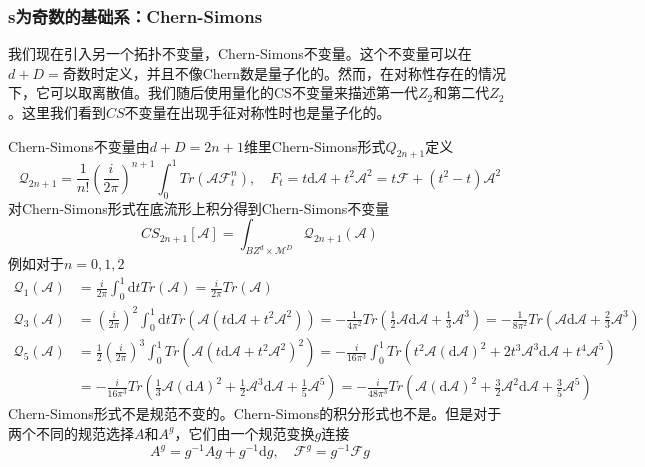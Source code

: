 \documentclass{article}
\numberwithin{equation}{subsection}
\begin{document}
\subsubsection{s为奇数的基础系：Chern-Simons}
我们现在引入另一个拓扑不变量，Chern-Simons不变量。这个不变量可以在$d+D=$奇数时定义，并且不像Chern数是量子化的。然而，在对称性存在的情况下，它可以取离散值。我们随后使用量化的CS不变量来描述第一代$Z_2$和第二代$Z_2$。这里我们看到$CS$不变量在出现手征对称性时也是量子化的。

Chern-Simons不变量由$d+D=2n+1$维里Chern-Simons形式$Q_{2n+1}$定义
\begin{equation}
    \mathcal{Q}_{2n+1}=\frac{1}{n!}\left(\frac{i}{2\pi}\right)^{n+1}\int_{0}^{1}Tr(\mathcal{AF}_{t}^n),\quad F_t=t\mathrm{d}\mathcal{A}+t^2\mathcal{A}^2=t\mathcal{F}+(t^2-t)\mathcal{A}^2
\end{equation}
对Chern-Simons形式在底流形上积分得到Chern-Simons不变量
\begin{equation}
    CS_{2n+1}[\mathcal{A}]=\int_{BZ^d\times\mathcal{M}^D}\mathcal{Q}_{2n+1}(\mathcal{A})
\end{equation}
例如对于$n=0,1,2$
\begin{equation}
    \begin{split}
        \mathcal{Q}_1(\mathcal{A})&=\frac{i}{2\pi}\int_0^1\mathrm{d}tTr(\mathcal{A})=\frac{i}{2\pi}Tr(\mathcal{A})\\
        \mathcal{Q}_3(\mathcal{A})&=\left(\frac{i}{2\pi}\right)^{2}\int_0^1\mathrm{d}tTr(\mathcal{A}(t\mathrm{d}\mathcal{A}+t^2\mathcal{A}^2))=-\frac{1}{4\pi^2}Tr(\frac{1}{2}\mathcal{A}\mathrm{d}\mathcal{A}+\frac{1}{3}\mathcal{A}^3)=-\frac{1}{8\pi^2}Tr(\mathcal{A}\mathrm{d}\mathcal{A}+\frac{2}{3}\mathcal{A}^3)\\
        \mathcal{Q}_5(\mathcal{A})&=\frac{1}{2}\left(\frac{i}{2\pi}\right)^3\int_0^1Tr(\mathcal{A}(t\mathrm{d}\mathcal{A}+t^2\mathcal{A}^2)^2)=-\frac{i}{16\pi^3}\int_0^1Tr(t^2\mathcal{A}(\mathrm{d}\mathcal{A})^2+2t^3\mathcal{A}^3\mathrm{d}\mathcal{A}+t^4\mathcal{A}^5)\\
        &=-\frac{i}{16\pi^3}Tr(\frac{1}{3}\mathcal{A}(\mathrm{d}A)^2+\frac{1}{2}\mathcal{A}^3\mathrm{d}\mathcal{A}+\frac{1}{5}\mathcal{A}^5)=-\frac{i}{48\pi^3}Tr(\mathcal{A}(\mathrm{d}\mathcal{A})^2+\frac{3}{2}\mathcal{A}^2\mathrm{d}\mathcal{A}+\frac{3}{5}\mathcal{A}^5)
    \end{split}
\end{equation}
Chern-Simons形式不是规范不变的。Chern-Simons的积分形式也不是。但是对于两个不同的规范选择$A$和$A^g$，它们由一个规范变换$g$连接
\begin{equation}
    A^g=g^{-1}Ag+g^{-1}\mathrm{d}g,\quad \mathcal{F}^g=g^{-1}\mathcal{F}g
\end{equation}
\end{document}
